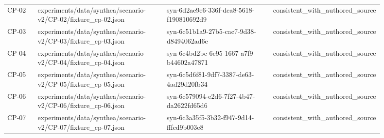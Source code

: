 {\begin{longtable}{p{0.08\linewidth}p{0.34\linewidth}p{0.28\linewidth}p{0.2\linewidth}}
CP-\allowbreak{}02 & experiments/\allowbreak{}data/\allowbreak{}synthea/\allowbreak{}scenario-\allowbreak{}v2/\allowbreak{}CP-\allowbreak{}02/\allowbreak{}fixture\_\allowbreak{}cp-\allowbreak{}02.\allowbreak{}json & syn-\allowbreak{}6d2ae9e6-\allowbreak{}336f-\allowbreak{}dca8-\allowbreak{}5618-\allowbreak{}f190810692d9 & consistent\_\allowbreak{}with\_\allowbreak{}authored\_\allowbreak{}source \\
CP-\allowbreak{}03 & experiments/\allowbreak{}data/\allowbreak{}synthea/\allowbreak{}scenario-\allowbreak{}v2/\allowbreak{}CP-\allowbreak{}03/\allowbreak{}fixture\_\allowbreak{}cp-\allowbreak{}03.\allowbreak{}json & syn-\allowbreak{}6c51b1a9-\allowbreak{}27b5-\allowbreak{}cac7-\allowbreak{}9d38-\allowbreak{}d8494062ad6e & consistent\_\allowbreak{}with\_\allowbreak{}authored\_\allowbreak{}source \\
CP-\allowbreak{}04 & experiments/\allowbreak{}data/\allowbreak{}synthea/\allowbreak{}scenario-\allowbreak{}v2/\allowbreak{}CP-\allowbreak{}04/\allowbreak{}fixture\_\allowbreak{}cp-\allowbreak{}04.\allowbreak{}json & syn-\allowbreak{}6c4bd2bc-\allowbreak{}6c95-\allowbreak{}1667-\allowbreak{}a7f9-\allowbreak{}b44602a47871 & consistent\_\allowbreak{}with\_\allowbreak{}authored\_\allowbreak{}source \\
CP-\allowbreak{}05 & experiments/\allowbreak{}data/\allowbreak{}synthea/\allowbreak{}scenario-\allowbreak{}v2/\allowbreak{}CP-\allowbreak{}05/\allowbreak{}fixture\_\allowbreak{}cp-\allowbreak{}05.\allowbreak{}json & syn-\allowbreak{}6c5d6f81-\allowbreak{}9df7-\allowbreak{}3387-\allowbreak{}de63-\allowbreak{}4ad29d20fb34 & consistent\_\allowbreak{}with\_\allowbreak{}authored\_\allowbreak{}source \\
CP-\allowbreak{}06 & experiments/\allowbreak{}data/\allowbreak{}synthea/\allowbreak{}scenario-\allowbreak{}v2/\allowbreak{}CP-\allowbreak{}06/\allowbreak{}fixture\_\allowbreak{}cp-\allowbreak{}06.\allowbreak{}json & syn-\allowbreak{}6c579094-\allowbreak{}e2d6-\allowbreak{}7f27-\allowbreak{}4b47-\allowbreak{}da2622fd65d6 & consistent\_\allowbreak{}with\_\allowbreak{}authored\_\allowbreak{}source \\
CP-\allowbreak{}07 & experiments/\allowbreak{}data/\allowbreak{}synthea/\allowbreak{}scenario-\allowbreak{}v2/\allowbreak{}CP-\allowbreak{}07/\allowbreak{}fixture\_\allowbreak{}cp-\allowbreak{}07.\allowbreak{}json & syn-\allowbreak{}6c3a35f5-\allowbreak{}3b32-\allowbreak{}f947-\allowbreak{}9d14-\allowbreak{}fffcd9b003e8 & consistent\_\allowbreak{}with\_\allowbreak{}authored\_\allowbreak{}source \\

\end{longtable}}
